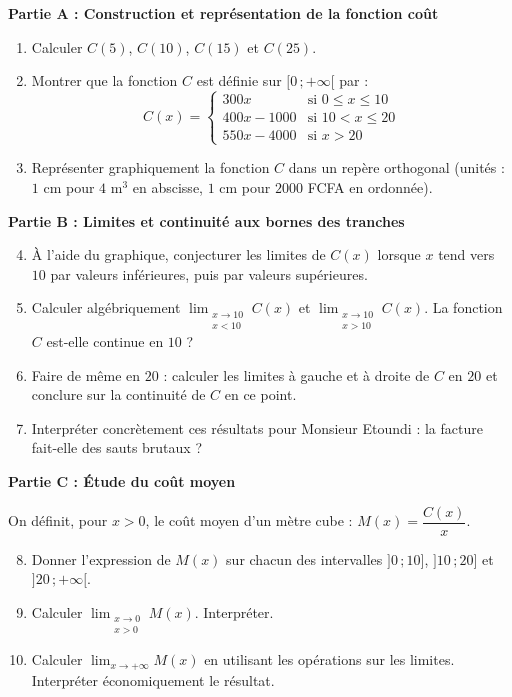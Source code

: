 \documentclass[11pt]{article}
\begin{document}
\textbf{Partie A : Construction et représentation de la fonction coût}

\begin{enumerate}
\item Calculer $C(5)$, $C(10)$, $C(15)$ et $C(25)$.
\item Montrer que la fonction $C$ est définie sur $[0\,;+\infty[$ par :
\[ C(x) = \begin{cases} 300x & \text{si } 0 \leq x \leq 10 \\ 400x - 1000 & \text{si } 10 < x \leq 20 \\ 550x - 4000 & \text{si } x > 20 \end{cases} \]
\item Représenter graphiquement la fonction $C$ dans un repère orthogonal (unités : $1$ cm pour $4$ m$^3$ en abscisse, $1$ cm pour $2000$ FCFA en ordonnée).
\end{enumerate}

\textbf{Partie B : Limites et continuité aux bornes des tranches}

\begin{enumerate}
\setcounter{enumi}{3}
\item À l'aide du graphique, conjecturer les limites de $C(x)$ lorsque $x$ tend vers $10$ par valeurs inférieures, puis par valeurs supérieures.
\item Calculer algébriquement $\displaystyle\lim_{\substack{x \to 10 \\ x < 10}} C(x)$ et $\displaystyle\lim_{\substack{x \to 10 \\ x > 10}} C(x)$. La fonction $C$ est-elle continue en $10$ ?
\item Faire de même en $20$ : calculer les limites à gauche et à droite de $C$ en $20$ et conclure sur la continuité de $C$ en ce point.
\item Interpréter concrètement ces résultats pour Monsieur Etoundi : la facture fait-elle des sauts brutaux ?
\end{enumerate}

\textbf{Partie C : Étude du coût moyen}

On définit, pour $x > 0$, le coût moyen d'un mètre cube : $M(x) = \dfrac{C(x)}{x}$.
\begin{enumerate}
\setcounter{enumi}{7}
\item Donner l'expression de $M(x)$ sur chacun des intervalles $]0\,;10]$, $]10\,;20]$ et $]20\,;+\infty[$.
\item Calculer $\displaystyle\lim_{\substack{x \to 0 \\ x > 0}} M(x)$. Interpréter.
\item Calculer $\displaystyle\lim_{x \to +\infty} M(x)$ en utilisant les opérations sur les limites. Interpréter économiquement le résultat.
\end{enumerate}
\end{document}
